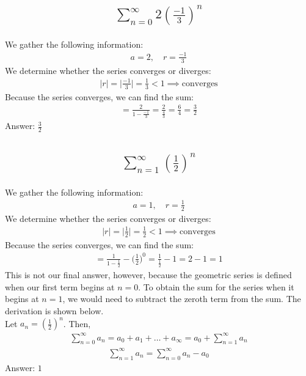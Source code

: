 \documentclass{article}
\begin{document}
\subsection{
	\begin{align*}
		\sum_{n = 0}^\infty 2 \left( \frac{-1}{3} \right)^n
	\end{align*}
}
We gather the following information:
\begin{align*}
	a = 2, \quad r = \frac{-1}{3}
\end{align*}
We determine whether the series converges or diverges:
\begin{align*}
	|r| = \bigg| \frac{-1}{3} \bigg| = \frac{1}{3} < 1 \implies \text{converges}
\end{align*}
Because the series converges, we can find the sum:
\begin{align*}
	= \frac{2}{1 - \frac{-1}{3}} = \frac{2}{\frac{4}{3}} = \frac{6}{4} = \frac{3}{2}
\end{align*}
Answer: $\frac{3}{2}$

\subsection{
	\begin{align*}
		\sum_{n = 1}^\infty \left( \frac{1}{2} \right)^n
	\end{align*}
}
We gather the following information:
\begin{align*}
	a = 1, \quad r = \frac{1}{2}
\end{align*}
We determine whether the series converges or diverges:
\begin{align*}
	|r| = \bigg| \frac{1}{2} \bigg| = \frac{1}{2} < 1 \implies \text{converges}
\end{align*}
Because the series converges, we can find the sum:
\begin{align*}
	= \frac{1}{1 - \frac{1}{2}} - \bigg( \frac{1}{2} \bigg)^0= \frac{1}{\frac{1}{2}} - 1= 2 - 1 = 1
\end{align*}
This is not our final answer, however, because the geometric series is defined when our first term begins at $n = 0$. To obtain the sum for the series when it begins at $n = 1$, we would need to subtract the zeroth term from the sum. The derivation is shown below. \\[10pt]
Let $a_n = (\frac{1}{2})^n$. Then,
\begin{align*}
	\sum_{n = 0}^\infty a_n = a_0 + a_1 + \dots + a_\infty = a_0 + \sum_{n = 1}^\infty a_n
\end{align*}
\begin{align*}
	\sum_{n = 1}^\infty a_n = \sum_{n = 0}^\infty a_n - a_0
\end{align*}
Answer: $1$
\end{document}
